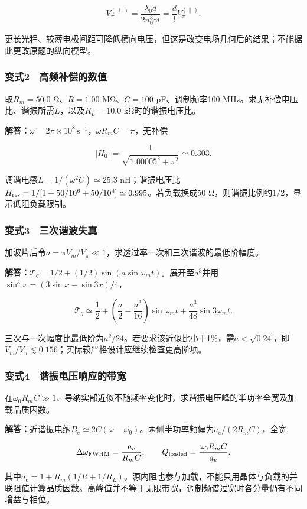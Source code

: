 \documentclass[12pt,a4paper,fontset=fandol]{ctexart}
\begin{document}
\[
V_\pi^{(\perp)}
=\frac{\lambda_0d}{2n_0^3\gamma l}
=\frac dl V_\pi^{(\parallel)}.
\]

更长光程、较薄电极间距可降低横向电压，但这是改变电场几何后的结果；不能据此更改原题的纵向模型。

\subsubsection{变式2　高频补偿的数值}\label{ux53d8ux5f0f2-ux9ad8ux9891ux8865ux507fux7684ux6570ux503c}

取\(R_m=50.0\) Ω、\(R=1.00\) MΩ、\(C=100\) pF、调制频率100
MHz。求无补偿电压比、谐振所需\(L\)，以及\(R_L=10.0\) kΩ时的谐振电压比。

\textbf{解答：}\(\omega=2\pi\times10^8\,\mathrm{s^{-1}}\)，\(\omega R_mC=\pi\)，无补偿

\[
|H_0|=\frac1{\sqrt{1.00005^2+\pi^2}}
\simeq0.303.
\]

调谐电感\(L=1/(\omega^2C)\simeq25.3\)
nH；谐振电压比\(H_{\rm res}=1/[1+50/10^6+50/10^4]\simeq0.995\)。若负载换成50
Ω，则谐振比例约1/2，显示低阻负载限制。

\subsubsection{变式3　三次谐波失真}\label{ux53d8ux5f0f3-ux4e09ux6b21ux8c10ux6ce2ux5931ux771f}

加波片后令\(a=\pi V_m/V_\pi\ll1\)，求透过率一次和三次谐波的最低阶幅度。

\textbf{解答：}\(\mathcal T_q=1/2+(1/2)\sin(a\sin\omega_mt)\)。展开至\(a^3\)并用\(\sin^3x=(3\sin x-\sin3x)/4\)，

\[
\mathcal T_q\simeq\frac12+
\left(\frac a2-\frac{a^3}{16}\right)\sin\omega_mt
+\frac{a^3}{48}\sin3\omega_mt.
\]

三次与一次幅度比最低阶为\(a^2/24\)。若要求该近似比小于1\%，需\(a<\sqrt{0.24}\)，即\(V_m/V_\pi\lesssim0.156\)；实际较严格设计应继续检查更高阶项。

\subsubsection{变式4　谐振电压响应的带宽}\label{ux53d8ux5f0f4-ux8c10ux632fux7535ux538bux54cdux5e94ux7684ux5e26ux5bbd}

在\(\omega_0R_mC\gg1\)、导纳实部近似不随频率变化时，求谐振电压峰的半功率全宽及加载品质因数。

\textbf{解答：}近谐振电纳\(B_e\simeq2C(\omega-\omega_0)\)。两侧半功率频偏为\(a_e/(2R_mC)\)，全宽

\[
\Delta\omega_{\rm FWHM}
=\frac{a_e}{R_mC},
\qquad
Q_{\rm loaded}=\frac{\omega_0R_mC}{a_e}.
\]

其中\(a_e=1+R_m(1/R+1/R_L)\)。源内阻也参与加载，不能只用晶体与负载的并联阻值计算品质因数。高峰值并不等于无限带宽，调制频谱过宽时各分量仍有不同增益与相位。
\end{document}
